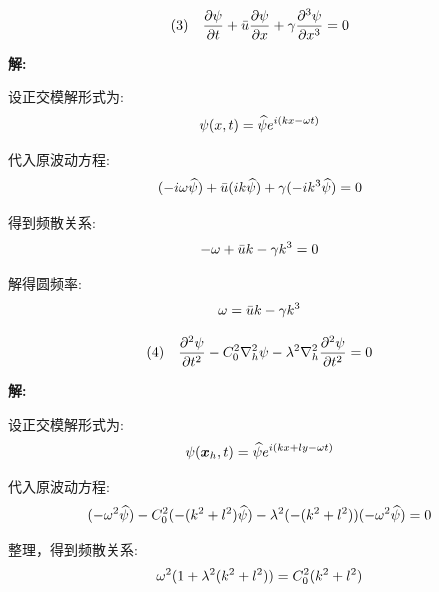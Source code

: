 \begin{enumerate}
    \begin{equation*}
        \text{(3)} \quad \pde{\psi}{\timevar} + \bar{u} \pde{\psi}{x} + \gamma \pde[3]{\psi}{x} = 0
    \end{equation*}

    \vspace{1em}
    \textbf{解:}

    设正交模解形式为:
    \begin{equation*}
        \psi(x, t) = \widehat{\psi} e^{i (k x - \omega t)}
    \end{equation*}

    代入原波动方程:
    \begin{equation*}
        (-i\omega \widehat{\psi}) + \bar{u} (ik \widehat{\psi}) + \gamma (-ik^3 \widehat{\psi}) = 0
    \end{equation*}

    得到频散关系:
    \begin{equation*}
        -\omega + \bar{u} k - \gamma k^3 = 0
    \end{equation*}

    解得圆频率:
    \begin{equation*}
        \omega = \bar{u} k - \gamma k^3
    \end{equation*}

    \begin{equation*}
        \text{(4)} \quad \pde[2]{\psi}{\timevar} - C_0^2 \nabla_h^2 \psi - \lambda^2 \nabla_h^2 \pde[2]{\psi}{\timevar} = 0
    \end{equation*}

    \vspace{1em}
    \textbf{解:}

    设正交模解形式为:
    \begin{equation*}
        \psi(\bm{x}_h, t) = \widehat{\psi} e^{i (k x + l y - \omega t)}
    \end{equation*}

    代入原波动方程:
    \begin{equation*}
        (-\omega^2 \widehat{\psi}) - C_0^2 (-(k^2 + l^2) \widehat{\psi}) - \lambda^2 (-(k^2 + l^2))(-\omega^2 \widehat{\psi}) = 0
    \end{equation*}

    整理，得到频散关系:
    \begin{equation*}
        \omega^2 (1 + \lambda^2 (k^2 + l^2)) = C_0^2 (k^2 + l^2)
    \end{equation*}


\end{enumerate}
